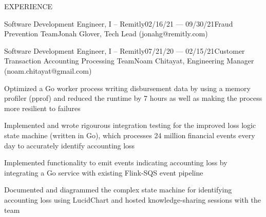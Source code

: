\documentclass{resume} %
\begin{document}
\begin{rSection}{EXPERIENCE}
\begin{rSubsection}{Software Development Engineer, I -- Remitly}{02/16/21 --- 09/30/21}{Fraud Prevention Team}{Jonah Glover, Tech Lead (jonahg@remitly.com)}
\end{rSubsection}

\begin{rSubsection}{Software Development Engineer, I -- Remitly}{07/21/20 --- 02/15/21}{Customer Transaction Accounting Processing Team}{Noam Chitayat, Engineering Manager (noam.chitayat@gmail.com)}
    
    \item Optimized a Go worker process writing disbursement data by using a memory profiler (pprof) and reduced the runtime by 7 hours as well as making the process more resilient to failures
    \item Implemented and wrote rigourous integration testing for the improved loss logic state machine (written in Go), which processes 24 million financial events every day to accurately identify accounting loss
    \item Implemented functionality to emit events indicating accounting loss by integrating a Go service with existing Flink-SQS event pipeline
    \item Documented and diagrammed the complex state machine for identifying accounting loss using LucidChart and hosted knowledge-sharing sessions with the team

\end{rSubsection}




\end{rSection}
\end{document}

